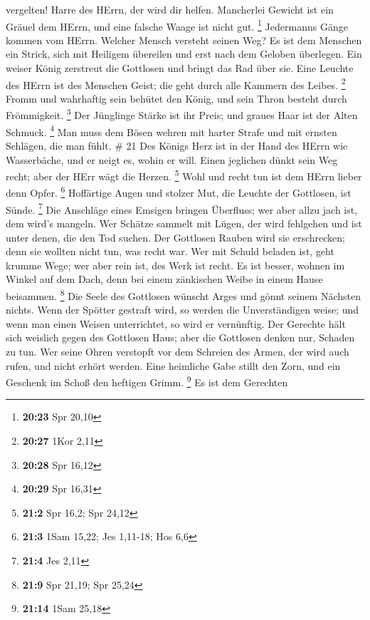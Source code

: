 vergelten! Harre des HErrn, der wird dir helfen. 
Mancherlei Gewicht ist ein Gräuel dem HErrn, und eine falsche Waage ist
nicht gut. \footnote{\textbf{20:23} Spr 20,10}  Jedermanns
Gänge kommen vom HErrn. Welcher Mensch versteht seinen Weg?
 Es ist dem Menschen ein Strick, sich mit Heiligem
übereilen und erst nach dem Geloben überlegen.  Ein weiser
König zerstreut die Gottlosen und bringt das Rad über sie. 
Eine Leuchte des HErrn ist des Menschen Geist; die geht durch alle
Kammern des Leibes. \footnote{\textbf{20:27} 1Kor 2,11} 
Fromm und wahrhaftig sein behütet den König, und sein Thron besteht
durch Frömmigkeit. \footnote{\textbf{20:28} Spr 16,12}  Der
Jünglinge Stärke ist ihr Preis; und graues Haar ist der Alten Schmuck.
\footnote{\textbf{20:29} Spr 16,31}  Man muss dem Bösen
wehren mit harter Strafe und mit ernsten Schlägen, die man fühlt. \# 21
 Des Königs Herz ist in der Hand des HErrn wie Wasserbäche,
und er neigt es, wohin er will.  Einen jeglichen dünkt sein
Weg recht; aber der HErr wägt die Herzen. \footnote{\textbf{21:2} Spr
  16,2; Spr 24,12}  Wohl und recht tun ist dem HErrn lieber
denn Opfer. \footnote{\textbf{21:3} 1Sam 15,22; Jes 1,11-18; Hos 6,6}
 Hoffärtige Augen und stolzer Mut, die Leuchte der
Gottlosen, ist Sünde. \footnote{\textbf{21:4} Jes 2,11}  Die
Anschläge eines Emsigen bringen Überfluss; wer aber allzu jach ist, dem
wird's mangeln.  Wer Schätze sammelt mit Lügen, der wird
fehlgehen und ist unter denen, die den Tod suchen.  Der
Gottlosen Rauben wird sie erschrecken; denn sie wollten nicht tun, was
recht war.  Wer mit Schuld beladen ist, geht krumme Wege;
wer aber rein ist, des Werk ist recht.  Es ist besser,
wohnen im Winkel auf dem Dach, denn bei einem zänkischen Weibe in einem
Hause beisammen. \footnote{\textbf{21:9} Spr 21,19; Spr 25,24}
 Die Seele des Gottlosen wünscht Arges und gönnt seinem
Nächsten nichts.  Wenn der Spötter gestraft wird, so werden
die Unverständigen weise; und wenn man einen Weisen unterrichtet, so
wird er vernünftig.  Der Gerechte hält sich weislich gegen
des Gottlosen Haus; aber die Gottlosen denken nur, Schaden zu tun.
 Wer seine Ohren verstopft vor dem Schreien des Armen, der
wird auch rufen, und nicht erhört werden.  Eine heimliche
Gabe stillt den Zorn, und ein Geschenk im Schoß den heftigen Grimm.
\footnote{\textbf{21:14} 1Sam 25,18}  Es ist dem Gerechten
